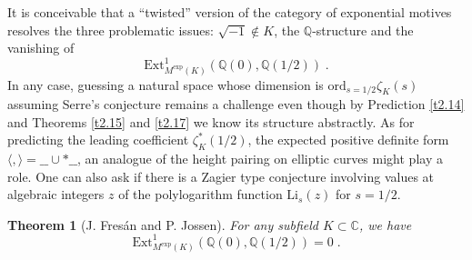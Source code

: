 \documentclass[12pt,leqno]{article}
\newcommand{\C}{{\mathbb{C}}}
\newcommand{\Q}{{\mathbb{Q}}}
\newcommand{\Li}{\mathrm{Li}}
\newcommand{\ord}{\mathrm{ord}}
\newcommand{\Ext}{\mathrm{Ext}}
\newtheorem{theorem}{Theorem}[section]
\begin{document}
It is conceivable that a ``twisted'' version of the category of exponential motives resolves the three problematic issues: $\sqrt{-1} \notin K$, the $\Q$-structure and the vanishing of 
\[
\Ext^1_{M^{\exp} (K)} (\Q (0), \Q (1/2)) \; .
\] 
In any case, guessing a natural space whose dimension is $\ord_{s = 1/2} \zeta_K (s)$ assuming Serre's conjecture remains a challenge even though by Prediction \ref{t2.14} and Theorems \ref{t2.15} and \ref{t2.17} we know its structure abstractly. As for predicting the leading coefficient $\zeta^*_K (1/2)$, the expected positive definite form $\langle , \rangle = \_\_ \cup* \_\_$, an analogue of the height pairing on elliptic curves might play a role. One can also ask if there is a Zagier type conjecture involving values at algebraic integers $z$ of the polylogarithm function $\Li_s (z)$ for $s = 1/2$. 

\begin{theorem}[J. Fres\'an and P. Jossen] \label{t4.1} 
For any subfield $K \subset \C$, we have
\[
\Ext^1_{M^{\exp} (K)} (\Q (0) , \Q (1/2)) = 0 \; .
\]
\end{theorem}
\end{document}
